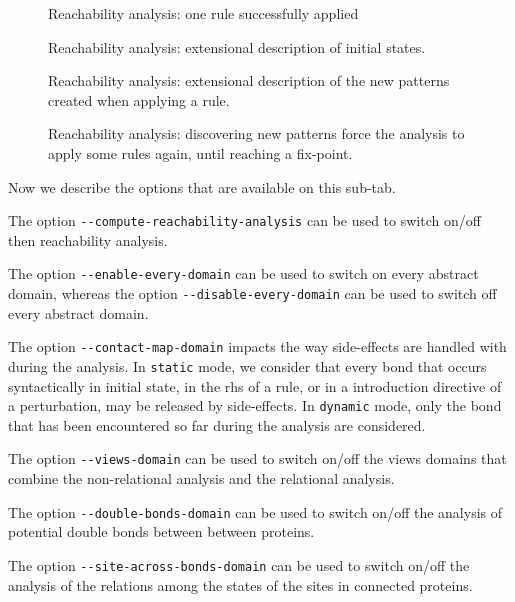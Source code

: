 \documentclass[11pt]{book}
\begin{document}
\begin{figure}[t]

\caption{Reachability analysis: one rule successfully applied}
\label{fig:reachability_medium_ok}
\end{figure}

\begin{figure}[t]

\caption{Reachability analysis: extensional description of initial states.}
\label{fig:reachability_high_init}
\end{figure}

\begin{figure}[t]

\caption{Reachability analysis: extensional description of the new patterns  created when applying a rule.}
\label{fig:reachability_high_rule}
\end{figure}

\begin{figure}[t]

\caption{Reachability analysis: discovering new patterns force the analysis to apply some rules again, until reaching a fix-point.}
\label{fig:reachability_full}
\end{figure}

Now we describe the options that are available on this sub-tab.

The option \verb?--compute-reachability-analysis? can be used to switch on/off then reachability analysis.

The option \verb?--enable-every-domain? can be used to switch on every abstract domain, whereas the option \verb?--disable-every-domain? can be used to switch off every abstract domain.

The option \verb?--contact-map-domain? impacts the way side-effects are handled with during the analysis. In \verb?static? mode, we consider that every bond that occurs syntactically in initial state, in the rhs of a rule, or in a introduction directive of a perturbation, may be released by side-effects.
In \verb?dynamic? mode, only the bond that has been encountered so far during the analysis are considered.

The option \verb?--views-domain? can be used to switch on/off the views domains that combine the non-relational analysis and the relational analysis.

The option \verb?--double-bonds-domain? can be used to switch on/off the analysis of potential double bonds between between proteins.

The option \verb?--site-across-bonds-domain? can be used to switch on/off the analysis of the relations among the states of the sites in connected proteins.
\end{document}
